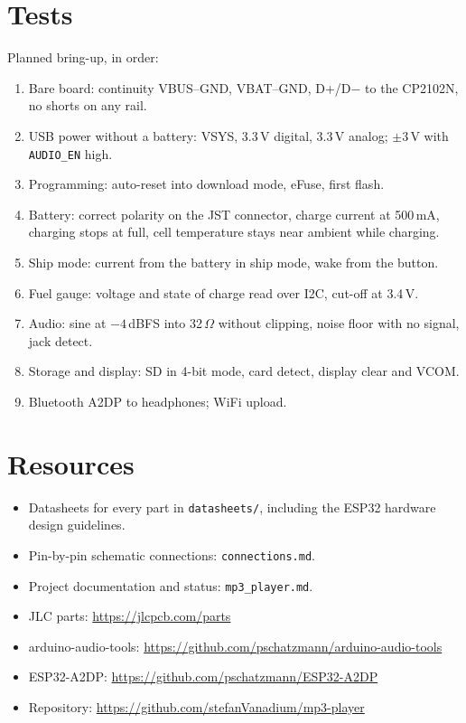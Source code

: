 \documentclass[11pt,a4paper]{article}
\begin{document}
\section{Tests}
Planned bring-up, in order:
\begin{enumerate}
  \item Bare board: continuity VBUS--GND, VBAT--GND, D+/D$-$ to the CP2102N, no shorts on any rail.
  \item USB power without a battery: VSYS, 3.3\,V digital, 3.3\,V analog; $\pm3$\,V with \texttt{AUDIO\_EN} high.
  \item Programming: auto-reset into download mode, eFuse, first flash.
  \item Battery: correct polarity on the JST connector, charge current at 500\,mA, charging stops at full, cell temperature stays near ambient while charging.
  \item Ship mode: current from the battery in ship mode, wake from the button.
  \item Fuel gauge: voltage and state of charge read over I2C, cut-off at 3.4\,V.
  \item Audio: sine at $-4$\,dBFS into 32\,$\Omega$ without clipping, noise floor with no signal, jack detect.
  \item Storage and display: SD in 4-bit mode, card detect, display clear and VCOM.
  \item Bluetooth A2DP to headphones; WiFi upload.
\end{enumerate}

\section{Resources}
\begin{itemize}
  \item Datasheets for every part in \texttt{datasheets/}, including the ESP32 hardware design guidelines.
  \item Pin-by-pin schematic connections: \texttt{connections.md}.
  \item Project documentation and status: \texttt{mp3\_player.md}.
  \item JLC parts: \url{https://jlcpcb.com/parts}
  \item arduino-audio-tools: \url{https://github.com/pschatzmann/arduino-audio-tools}
  \item ESP32-A2DP: \url{https://github.com/pschatzmann/ESP32-A2DP}
  \item Repository: \url{https://github.com/stefanVanadium/mp3-player}
\end{itemize}
\end{document}
